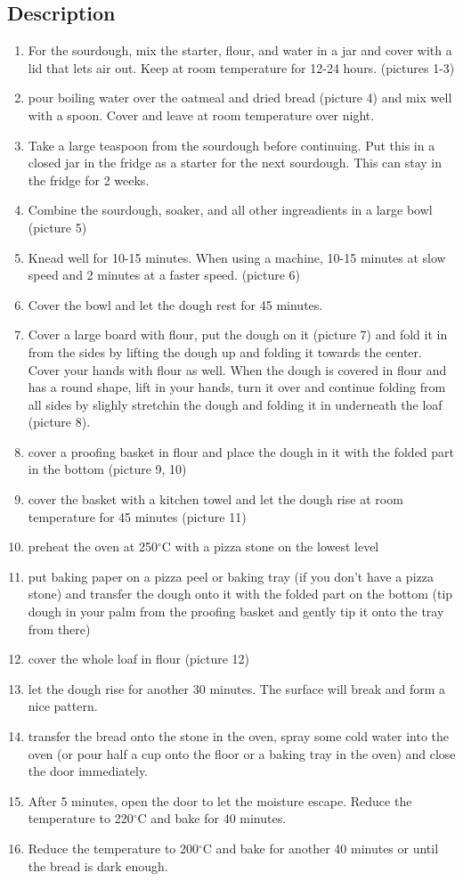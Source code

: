 \subsection*{Description}
\begin{enumerate}
	\item For the sourdough, mix the starter, flour, and water in a jar and cover with a lid that lets air out. Keep at room temperature for 12-24 hours. (pictures 1-3)
	\item pour boiling water over the oatmeal and dried bread (picture 4) and mix well with a spoon. Cover and leave at room temperature over night.
	\item Take a large teaspoon from the sourdough before continuing. Put this in a closed jar in the fridge as a starter for the next sourdough. This can stay in the fridge for 2 weeks.
	\item Combine the sourdough, soaker, and all other ingreadients in a large bowl (picture 5)
	\item Knead well for 10-15 minutes. When using a machine, 10-15 minutes at slow speed and 2 minutes at a faster speed. (picture 6)
	\item Cover the bowl and let the dough rest for 45 minutes.
	\item Cover a large board with flour, put the dough on it (picture 7) and fold it in from the sides by lifting the dough up and folding it towards the center. Cover your hands with flour as well. When the dough is covered in flour and has a round shape, lift in your hands, turn it over and continue folding from all sides by slighly stretchin the dough and folding it in underneath the loaf (picture 8).
	\item cover a proofing basket in flour and place the dough in it with the folded part in the bottom (picture 9, 10)
	\item cover the basket with a kitchen towel and let the dough rise at room temperature for 45 minutes (picture 11)
  \item preheat the oven at 250$^\circ$C with a pizza stone on the lowest level
  \item put baking paper on a pizza peel or baking tray (if you don't have a pizza stone) and transfer the dough onto it with the folded part on the bottom (tip dough in your palm from the proofing basket and gently tip it onto the tray from there)
  \item cover the whole loaf in flour (picture 12)
  \item let the dough rise for another 30 minutes. The surface will break and form a nice pattern.
  \item transfer the bread onto the stone in the oven, spray some cold water into the oven (or pour half a cup onto the floor or a baking tray in the oven) and close the door immediately.
  \item After 5 minutes, open the door to let the moisture escape. Reduce the temperature to 220$^\circ$C and bake for 40 minutes.
  \item Reduce the temperature to 200$^\circ$C and bake for another 40 minutes or until the bread is dark enough.
\end{enumerate}

